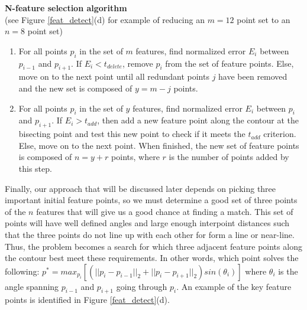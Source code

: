 \documentclass[paper=a4, fontsize=11pt]{scrartcl} %
\begin{document}
\textbf{N-feature selection algorithm}
\\
(see Figure \ref{feat_detect}(d) for example of reducing an $m = 12$ point set to an $n = 8$ point set)
\begin{enumerate}
	\item 
	For all points $p_i$ in the set of $m$ features, find normalized error $E_i$ between $p_{i-1}$ and $p_{i+1}$. If $E_i < t_{delete}$, remove $p_i$ from the set of feature points. Else, move on to the next point until all redundant points $j$ have been removed and the new set is composed of $y = m - j$ points.  
	\item
	For all points $p_i$ in the set of $y$ features, find normalized error $E_i$ between $p_{i}$ and $p_{i+1}$. If $E_i > t_{add}$, then add a new feature point along the contour at the bisecting point and test this new point to check if it meets the $t_{add}$ criterion. Else, move on to the next point. When finished, the new set of feature points is composed of $n = y + r$ points, where $r$ is the number of points added by this step. 
\end{enumerate}


Finally, our approach that will be discussed later depends on picking three important initial feature points, so we must determine a good set of three points of the $n$ features that will give us a good chance at finding a match. This set of points will have well defined angles and large enough interpoint distances such that the three points do not line up with each other for form a line or near-line. Thus, the problem becomes a search for which three adjacent feature points along the contour best meet these requirements. In other words, which point solves the following: $p^* = max_{p_i} [ (||p_i - p_{i-1}||_2 + ||p_i - p_{i+1}||_2) sin(\theta_i) ]$ where $\theta_i$ is the angle spanning $p_{i-1}$ and $p_{i+1}$ going through $p_i$. An example of the key feature points is identified in Figure \ref{feat_detect}(d). 
\end{document}
